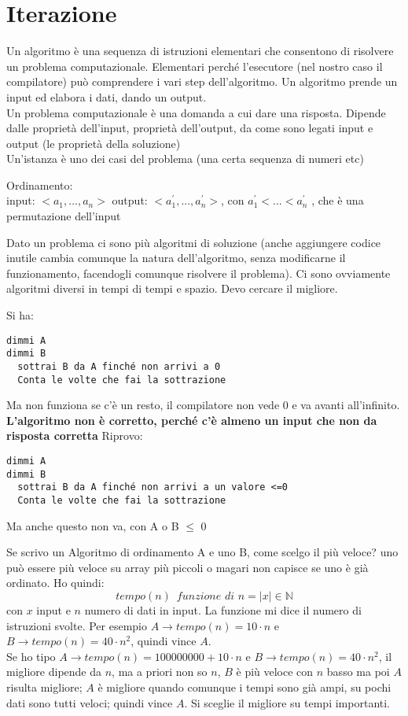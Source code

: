 \documentclass[a4paper,12pt,oneside,tikz]{book}
\begin{document}
\chapter{Iterazione}
\begin{definizione}
Un algoritmo è una sequenza di istruzioni elementari che consentono di risolvere un problema computazionale. Elementari perché l'esecutore (nel nostro caso il compilatore) può comprendere i vari step dell'algoritmo. Un algoritmo prende un input ed elabora i dati, dando un output.\\
Un problema computazionale è una domanda a cui dare una risposta. Dipende dalle proprietà dell'input, proprietà dell'output, da come sono legati input e output (le proprietà della soluzione)\\
Un'istanza è uno dei casi del problema (una certa sequenza di numeri etc)
\end{definizione}
\begin{esempio}
Ordinamento:\\
input: $<a_1,...,a_n>$
output: $<a^{'}_1,...,a^{'}_n>$, con $a^{'}_1<...<a^{'}_n$ , che è una permutazione dell'input
\end{esempio}
Dato un problema ci sono più algoritmi di soluzione (anche aggiungere codice inutile cambia comunque la natura dell'algoritmo, senza modificarne il funzionamento, facendogli comunque risolvere il problema). Ci sono ovviamente algoritmi diversi in tempi di tempi e spazio. Devo cercare il migliore.
\begin{esempio}[divisione]
Si ha:
\begin{verbatim}
dimmi A
dimmi B
  sottrai B da A finché non arrivi a 0
  Conta le volte che fai la sottrazione
\end{verbatim}
Ma non funziona se c'è un resto, il compilatore non vede 0 e va avanti all'infinito. \textbf{L'algoritmo non è corretto, perché c'è almeno un input che non da risposta corretta}
\newpage
Riprovo:
\begin{verbatim}
dimmi A
dimmi B
  sottrai B da A finché non arrivi a un valore <=0
  Conta le volte che fai la sottrazione
\end{verbatim}
Ma anche questo non va, con A o B $\leq$ 0
\end{esempio}
Se scrivo un Algoritmo di ordinamento A e uno B, come scelgo il più veloce? uno può essere più veloce su array più piccoli o magari non capisce se uno è già ordinato. Ho quindi:
$$tempo(n)\,\,\, funzione \,\, di \,\, n=|x|\in\mathbb{N}$$
con $x$ input e $n$ numero di dati in input. La funzione mi dice il numero di istruzioni svolte. Per esempio $A\rightarrow tempo(n)=10\cdot n$ e $B\rightarrow tempo(n)=40\cdot n^2$, quindi vince $A$.\\ Se ho tipo $A\rightarrow tempo(n)=100000000+10\cdot n$ e $B\rightarrow tempo(n)=40\cdot n^2$, il migliore dipende da $n$, ma a priori non so $n$, $B$ è più veloce con $n$ basso ma poi $A$ risulta migliore; $A$ è migliore quando comunque i tempi sono già ampi, su pochi dati sono tutti veloci; quindi vince $A$. Si sceglie il migliore su tempi importanti. \\
\end{document}
